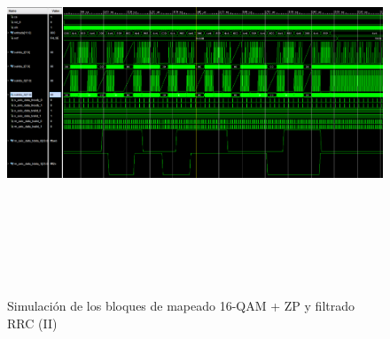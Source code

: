 \begin{figure}
	\centering
	\includegraphics[width=1\textwidth,height=12cm]{img/simu/rrc2.PNG}
	\caption{Simulación de los bloques de mapeado 16-QAM + ZP y filtrado RRC (II)}
	\label{fig:rrc2}
\end{figure}
